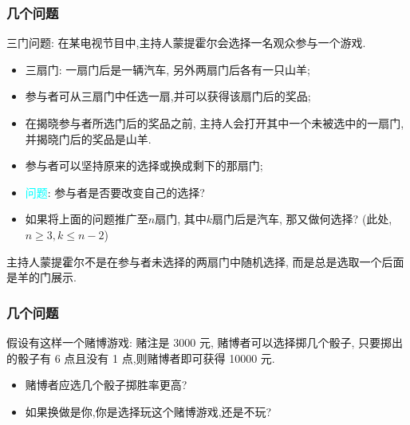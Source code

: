 \documentclass[Prob-All.tex]{subfiles}
\begin{document}

\begin{frame}
	\frametitle{几个问题}
	\begin{prob}三门问题: 在某电视节目中,主持人蒙提霍尔会选择一名观众参与一个游戏.
		\begin{itemize}[<+-|alert@+>]
			\item 三扇门: 一扇门后是一辆汽车, 另外两扇门后各有一只山羊;
			\item 参与者可从三扇门中任选一扇,并可以获得该扇门后的奖品;
			\item 在揭晓参与者所选门后的奖品之前, 主持人会打开其中一个未被选中的一扇门,并揭晓门后的奖品是山羊.

			\item 参与者可以坚持原来的选择或换成剩下的那扇门;
			\item  \textcolor{cyan}{问题}: 参与者是否要改变自己的选择?

			\item 如果将上面的问题推广至$n$扇门, 其中$k$扇门后是汽车, 那又做何选择? (此处, $n\geq 3, k\leq n-2$)
		\end{itemize}

	\end{prob}
	\pause
	\begin{rmk}
		主持人蒙提霍尔不是在参与者未选择的两扇门中随机选择, 而是总是选取一个后面是羊的门展示.
	\end{rmk}

\end{frame}


\begin{frame}
	\frametitle{几个问题}
	\begin{prob}
		假设有这样一个赌博游戏: 赌注是 3000 元, 赌博者可以选择掷几个骰子, 只要掷出的骰子有 6 点且没有 1 点,则赌博者即可获得 10000 元.
		\begin{itemize}[<+-|alert@+>]
			\item 赌博者应选几个骰子掷胜率更高?

			\item 如果换做是你,你是选择玩这个赌博游戏,还是不玩?
		\end{itemize}
	\end{prob}


\end{frame}
\end{document}
